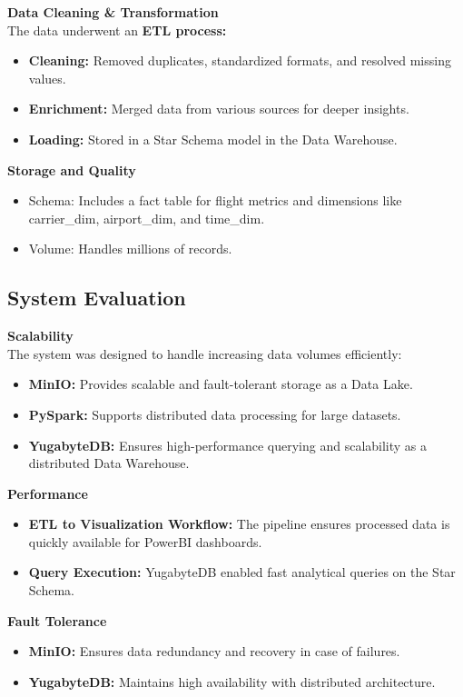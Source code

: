 \documentclass[12pt,a4paper]{article}
\begin{document}
\textbf{Data Cleaning \& Transformation}\\
The data underwent an \textbf{ETL process:}
\begin{itemize}
    \item \textbf{Cleaning:} Removed duplicates, standardized formats, and resolved missing values.
    \item \textbf{Enrichment:} Merged data from various sources for deeper insights.
    \item \textbf{Loading: } Stored in a Star Schema model in the Data Warehouse.
\end{itemize}

\textbf{Storage and Quality}
\begin{itemize}
    \item Schema: Includes a fact table for flight metrics and dimensions like carrier\_dim, airport\_dim, and time\_dim.
    \item Volume: Handles millions of records.
\end{itemize}

\subsection{System Evaluation}
\textbf{Scalability}\\
The system was designed to handle increasing data volumes efficiently:
\begin{itemize}
    \item \textbf{MinIO:} Provides scalable and fault-tolerant storage as a Data Lake.
    \item \textbf{PySpark:} Supports distributed data processing for large datasets.
    \item \textbf{YugabyteDB:} Ensures high-performance querying and scalability as a distributed Data Warehouse.
\end{itemize}

\textbf{Performance}
\begin{itemize}
    \item \textbf{ETL to Visualization Workflow:} The pipeline ensures processed data is quickly available for PowerBI dashboards.
    \item \textbf{Query Execution:} YugabyteDB enabled fast analytical queries on the Star Schema.
\end{itemize}

\textbf{Fault Tolerance}
\begin{itemize}
    \item \textbf{MinIO:} Ensures data redundancy and recovery in case of failures.
    \item \textbf{YugabyteDB:} Maintains high availability with distributed architecture.
\end{itemize}
\end{document}
